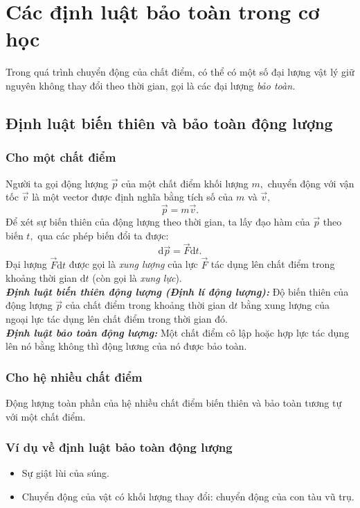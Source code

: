 \chapter{Các định luật bảo toàn trong cơ học}
Trong quá trình chuyển động của chất điểm, có thể có một số đại lượng vật lý giữ nguyên không thay đổi theo thời gian, gọi là các đại lượng \textit{bảo toàn.}
\section{Định luật biến thiên và bảo toàn động lượng}
\subsection{Cho một chất điểm}
Người ta gọi động lượng $\overrightarrow{p}$ của một chất điểm khối lượng $m,$ chuyển động với vận tốc $\overrightarrow{v}$ là một vector được định nghĩa bằng tích số của $m$ và $\overrightarrow{v},$
$$\overrightarrow{p} = m \overrightarrow{v}.$$
Để xét sự biến thiên của động lượng theo thời gian, ta lấy đạo hàm của $\overrightarrow{p}$ theo biến $t,$ qua các phép biến đổi ta được:
$$\mathrm{d}\overrightarrow{p} = \overrightarrow{F} \mathrm{d}t.$$
Đại lượng $\overrightarrow{F} \mathrm{d}t$ được gọi là \textit{xung lượng} của lực $\overrightarrow{F}$ tác dụng lên chất điểm trong khoảng thời gian $\mathrm{d}t$ (còn gọi là \textit{xung lực}).\\
\textbf{\textit{Định luật biến thiên động lượng (Định lí động lượng):}} Độ biến thiên của động lượng $\overrightarrow{p}$ của chất điểm trong khoảng thời gian $\mathrm{d}t$ bằng xung lượng của ngoại lực tác dụng lên chất điểm trong thời gian đó.\\
\textbf{\textit{Định luật bảo toàn động lượng:}} Một chất điểm cô lập hoặc hợp lực tác dụng lên nó bằng không thì động lương của nó được bảo toàn.
\subsection{Cho hệ nhiều chất điểm}
Động lượng toàn phần của hệ nhiều chất điểm biến thiên và bảo toàn tương tự với một chất điểm.
\subsection{Ví dụ về định luật bảo toàn động lượng}
\begin{itemize}
\item Sự giật lùi của súng.
\item Chuyển động của vật có khối lượng thay đổi: chuyển động của con tàu vũ trụ.
\end{itemize}
